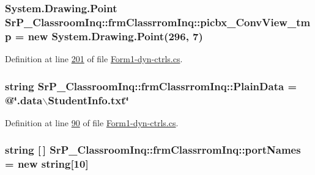\hypertarget{class_sr_p___classroom_inq_1_1frm_classrrom_inq_ae49fd425a3c4f52d94af6c20b67f6126}{
\subsubsection[{picbx\-\_\-\-Conv\-View\-\_\-tmp}]{\setlength{\rightskip}{0pt plus 5cm}\-System.\-Drawing.\-Point {\bf \-Sr\-P\-\_\-\-Classroom\-Inq\-::frm\-Classrrom\-Inq\-::picbx\-\_\-\-Conv\-View\-\_\-tmp} = new \-System.\-Drawing.\-Point(296, 7)}}
\label{class_sr_p___classroom_inq_1_1frm_classrrom_inq_ae49fd425a3c4f52d94af6c20b67f6126}


\-Definition at line \hyperlink{_form1-dyn-ctrls_8cs_source_l00201}{201} of file \hyperlink{_form1-dyn-ctrls_8cs_source}{\-Form1-\/dyn-\/ctrls.\-cs}.

\hypertarget{class_sr_p___classroom_inq_1_1frm_classrrom_inq_a511d08cf3bdc5282be448f0513bbd262}{
\subsubsection[{\-Plain\-Data}]{\setlength{\rightskip}{0pt plus 5cm}string {\bf \-Sr\-P\-\_\-\-Classroom\-Inq\-::frm\-Classrrom\-Inq\-::\-Plain\-Data} = @\char`\"{}.data$\backslash$\-Student\-Info.\-txt\char`\"{}}}
\label{class_sr_p___classroom_inq_1_1frm_classrrom_inq_a511d08cf3bdc5282be448f0513bbd262}


\-Definition at line \hyperlink{_form1-dyn-ctrls_8cs_source_l00090}{90} of file \hyperlink{_form1-dyn-ctrls_8cs_source}{\-Form1-\/dyn-\/ctrls.\-cs}.

\hypertarget{class_sr_p___classroom_inq_1_1frm_classrrom_inq_a9c5b06a44069e68e732d7bcd7a8fa08c}{
\subsubsection[{port\-Names}]{\setlength{\rightskip}{0pt plus 5cm}string \mbox{[}$\,$\mbox{]} {\bf \-Sr\-P\-\_\-\-Classroom\-Inq\-::frm\-Classrrom\-Inq\-::port\-Names} = new string\mbox{[}10\mbox{]}}}
\label{class_sr_p___classroom_inq_1_1frm_classrrom_inq_a9c5b06a44069e68e732d7bcd7a8fa08c}


